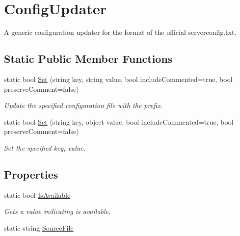 \hypertarget{classOTA_1_1ConfigUpdater}{}\section{Config\+Updater}
\label{classOTA_1_1ConfigUpdater}


A generic configuration updater for the format of the official serverconfig.\+txt.  


\subsection*{Static Public Member Functions}
\begin{DoxyCompactItemize}
\item 
static bool \hyperlink{classOTA_1_1ConfigUpdater_a011da67e3e5ed70f9513daeecdaa5d14}{Set} (string key, string value, bool include\+Commented=true, bool preserve\+Comment=false)
\begin{DoxyCompactList}\small\item\em Update the specified configuration file with the prefix. \end{DoxyCompactList}\item 
static bool \hyperlink{classOTA_1_1ConfigUpdater_a5cc3e425a8df501422db6ed637d7a0fc}{Set} (string key, object value, bool include\+Commented=true, bool preserve\+Comment=false)
\begin{DoxyCompactList}\small\item\em Set the specified key, value. \end{DoxyCompactList}\end{DoxyCompactItemize}
\subsection*{Properties}
\begin{DoxyCompactItemize}
\item 
static bool \hyperlink{classOTA_1_1ConfigUpdater_a7a547596c0c095817d16bbe4ba4c48f4}{Is\+Available}
\begin{DoxyCompactList}\small\item\em Gets a value indicating is available. \end{DoxyCompactList}\item 
static string \hyperlink{classOTA_1_1ConfigUpdater_a0b6a7aa2ed188dc7820c804906dd8ead}{Source\+File}
\end{DoxyCompactItemize}


